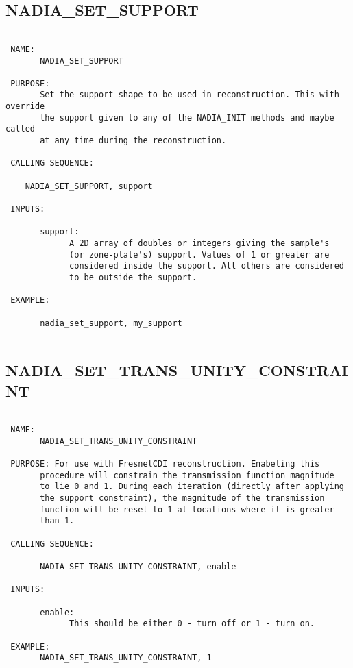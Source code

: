 \subsection{NADIA\_SET\_SUPPORT}
\begin{verbatim}

 NAME:
       NADIA_SET_SUPPORT

 PURPOSE:
       Set the support shape to be used in reconstruction. This with override 
       the support given to any of the NADIA_INIT methods and maybe called
       at any time during the reconstruction.  

 CALLING SEQUENCE:

	NADIA_SET_SUPPORT, support

 INPUTS:

       support: 
             A 2D array of doubles or integers giving the sample's 
             (or zone-plate's) support. Values of 1 or greater are 
             considered inside the support. All others are considered 
             to be outside the support.

 EXAMPLE:

       nadia_set_support, my_support


\end{verbatim}






  
 
\subsection{NADIA\_SET\_TRANS\_UNITY\_CONSTRAINT}
\begin{verbatim}

 NAME:
       NADIA_SET_TRANS_UNITY_CONSTRAINT

 PURPOSE: For use with FresnelCDI reconstruction. Enabeling this
       procedure will constrain the transmission function magnitude
       to lie 0 and 1. During each iteration (directly after applying
       the support constraint), the magnitude of the transmission
       function will be reset to 1 at locations where it is greater
       than 1.

 CALLING SEQUENCE:

       NADIA_SET_TRANS_UNITY_CONSTRAINT, enable

 INPUTS:

       enable:
             This should be either 0 - turn off or 1 - turn on.

 EXAMPLE:
       NADIA_SET_TRANS_UNITY_CONSTRAINT, 1

\end{verbatim}

